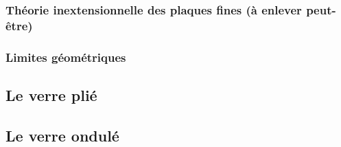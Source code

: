 \documentclass[11pt,titlepage]{article}
\begin{document}
\subsubsection{Théorie inextensionnelle des plaques fines (à enlever peut-être)}

\subsubsection{Limites géométriques}

\subsection{Le verre plié}
\newpage
\subsection{Le verre ondulé}
\end{document}
